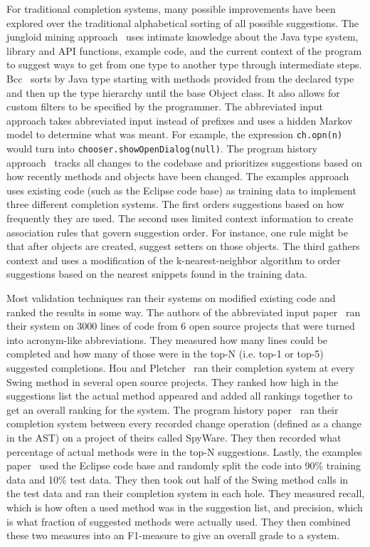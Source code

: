 \documentclass[ms,electronic,twosidetoc,letterpaper,chaptercenter,parttop,lol,lof,lot]{byumsphd}
\begin{document}
For traditional completion systems, many possible improvements have been explored over the
traditional alphabetical sorting of all possible suggestions. The jungloid mining
approach~\cite{Jungloid} uses intimate knowledge about the Java type system, library and
API functions, example code, and the current context of the program to suggest ways to get
from one type to another type through intermediate steps. Bcc~\cite{BCC} sorts by Java
type starting with methods provided from the declared type and then up the type hierarchy
until the base Object class. It also allows for custom filters to be specified by the
programmer. The abbreviated input approach\cite{Abbreviated} takes abbreviated input
instead of prefixes and uses a hidden Markov model to determine what was meant. For
example, the expression \texttt{ch.opn(n)} would turn into
\texttt{chooser.showOpenDialog(null)}. The program history approach~\cite{History} tracks
all changes to the codebase and prioritizes suggestions based on how recently methods and
objects have been changed. The examples approach~\cite{Examples} uses existing code (such
as the Eclipse code base) as training data to implement three different completion
systems. The first orders suggestions based on how frequently they are used. The second
uses limited context information to create association rules that govern suggestion order.
For instance, one rule might be that after objects are created, suggest setters on those
objects. The third gathers context and uses a modification of the k-nearest-neighbor
algorithm to order suggestions based on the nearest snippets found in the training data.

Most validation techniques ran their systems on modified existing code and ranked the
results in some way. The authors of the abbreviated input paper~\cite{Abbreviated} ran
their system on 3000 lines of code from 6 open source projects that were turned into
acronym-like abbreviations. They measured how many lines could be completed and how many
of those were in the top-N (i.e. top-1 or top-5) suggested completions. Hou and
Pletcher~\cite{Towards} ran their completion system at every Swing method in several open
source projects. They ranked how high in the suggestions list the actual method appeared
and added all rankings together to get an overall ranking for the system. The program
history paper~\cite{History} ran their completion system between every recorded change
operation (defined as a change in the AST) on a project of theirs called SpyWare. They
then recorded what percentage of actual methods were in the top-N suggestions. Lastly, the
examples paper~\cite{Examples} used the Eclipse code base and randomly split the code into
90\% training data and 10\% test data. They then took out half of the Swing method calls
in the test data and ran their completion system in each hole. They measured recall, which
is how often a used method was in the suggestion list, and precision, which is what
fraction of suggested methods were actually used. They then combined these two measures
into an F1-measure to give an overall grade to a system.
\end{document}
